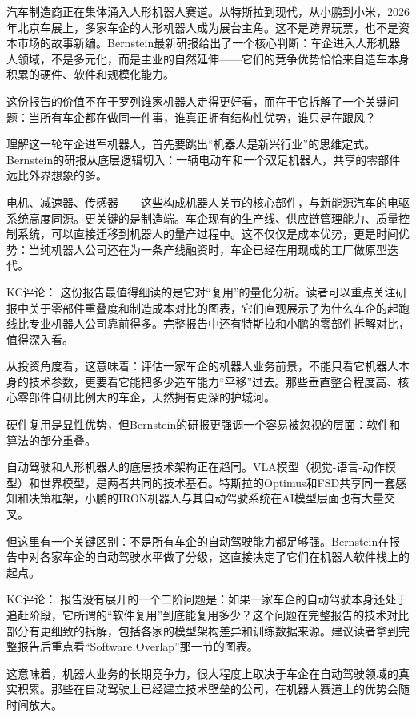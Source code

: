 \documentclass[11pt]{ctexart}
\begin{document}
汽车制造商正在集体涌入人形机器人赛道。从特斯拉到现代，从小鹏到小米，2026年北京车展上，多家车企的人形机器人成为展台主角。这不是跨界玩票，也不是资本市场的故事新编。Bernstein最新研报给出了一个核心判断：车企进入人形机器人领域，不是多元化，而是主业的自然延伸——它们的竞争优势恰恰来自造车本身积累的硬件、软件和规模化能力。

这份报告的价值不在于罗列谁家机器人走得更好看，而在于它拆解了一个关键问题：当所有车企都在做同一件事，谁真正拥有结构性优势，谁只是在跟风？

理解这一轮车企进军机器人，首先要跳出“机器人是新兴行业”的思维定式。Bernstein的研报从底层逻辑切入：一辆电动车和一个双足机器人，共享的零部件远比外界想象的多。

电机、减速器、传感器——这些构成机器人关节的核心部件，与新能源汽车的电驱系统高度同源。更关键的是制造端。车企现有的生产线、供应链管理能力、质量控制系统，可以直接迁移到机器人的量产过程中。这不仅仅是成本优势，更是时间优势：当纯机器人公司还在为一条产线融资时，车企已经在用现成的工厂做原型迭代。

KC评论： 这份报告最值得细读的是它对“复用”的量化分析。读者可以重点关注研报中关于零部件重叠度和制造成本对比的图表，它们直观展示了为什么车企的起跑线比专业机器人公司靠前得多。完整报告中还有特斯拉和小鹏的零部件拆解对比，值得深入看。

从投资角度看，这意味着：评估一家车企的机器人业务前景，不能只看它机器人本身的技术参数，更要看它能把多少造车能力“平移”过去。那些垂直整合程度高、核心零部件自研比例大的车企，天然拥有更深的护城河。

硬件复用是显性优势，但Bernstein的研报更强调一个容易被忽视的层面：软件和算法的部分重叠。

自动驾驶和人形机器人的底层技术架构正在趋同。VLA模型（视觉-语言-动作模型）和世界模型，是两者共同的技术基石。特斯拉的Optimus和FSD共享同一套感知和决策框架，小鹏的IRON机器人与其自动驾驶系统在AI模型层面也有大量交叉。

但这里有一个关键区别：不是所有车企的自动驾驶能力都足够强。Bernstein在报告中对各家车企的自动驾驶水平做了分级，这直接决定了它们在机器人软件栈上的起点。

KC评论： 报告没有展开的一个二阶问题是：如果一家车企的自动驾驶本身还处于追赶阶段，它所谓的“软件复用”到底能复用多少？这个问题在完整报告的技术对比部分有更细致的拆解，包括各家的模型架构差异和训练数据来源。建议读者拿到完整报告后重点看“Software Overlap”那一节的图表。

这意味着，机器人业务的长期竞争力，很大程度上取决于车企在自动驾驶领域的真实积累。那些在自动驾驶上已经建立技术壁垒的公司，在机器人赛道上的优势会随时间放大。
\end{document}
